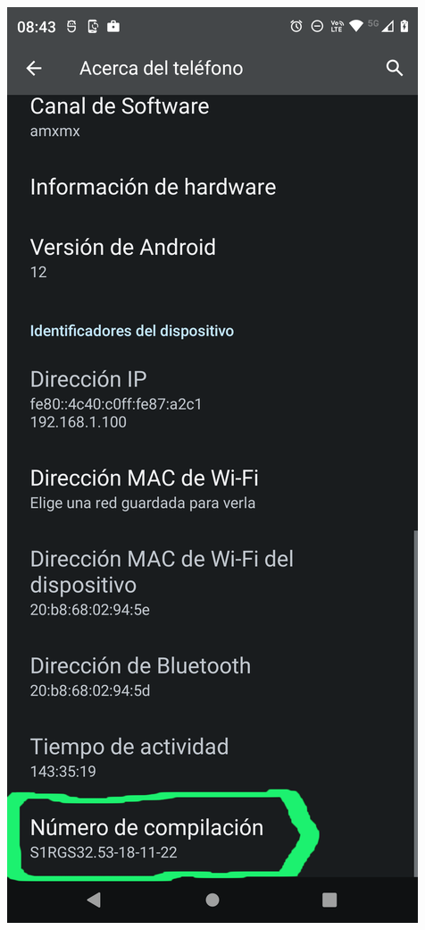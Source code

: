 \begin{frame}
\begin{columns}
\begin{center}
\end{center}
\begin{center}
\includegraphics[width=0.95\linewidth]{00_Configurar/ModoDesarrollador4.png}    
\end{center}


\end{columns}

\end{frame}


